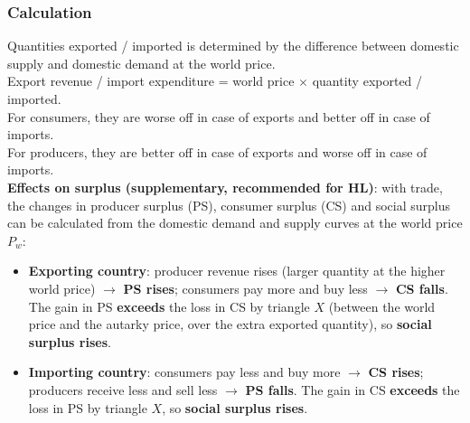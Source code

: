 \subsubsection*{Calculation}
Quantities exported / imported is determined by the difference between domestic supply and domestic demand at the world price. \\
Export revenue / import expenditure = world price $\times$ quantity exported / imported.\\
For consumers, they are worse off in case of exports and better off in case of imports. \\
For producers, they are better off in case of exports and worse off in case of imports.\\
\textbf{Effects on surplus (supplementary, recommended for HL)}: with trade, the changes in producer surplus (PS), consumer surplus (CS) and social surplus can be calculated from the domestic demand and supply curves at the world price $P_w$:
\begin{itemize}
  \item \textbf{Exporting country}: producer revenue rises (larger quantity at the higher world price) $\to$ \textbf{PS rises}; consumers pay more and buy less $\to$ \textbf{CS falls}. The gain in PS \textbf{exceeds} the loss in CS by triangle $X$ (between the world price and the autarky price, over the extra exported quantity), so \textbf{social surplus rises}.
  \item \textbf{Importing country}: consumers pay less and buy more $\to$ \textbf{CS rises}; producers receive less and sell less $\to$ \textbf{PS falls}. The gain in CS \textbf{exceeds} the loss in PS by triangle $X$, so \textbf{social surplus rises}.
\end{itemize}
